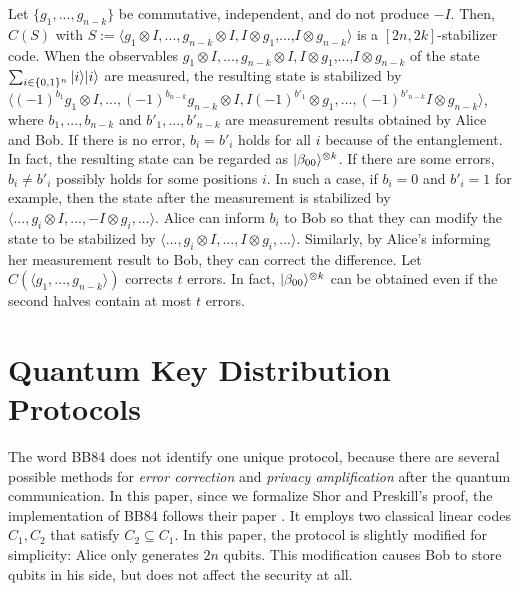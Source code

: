 Let $\{ g_1,...,g_{n-k} \}$ be commutative, independent, and do not
produce $-I$.
Then, $C(S)$ with $S := \langle g_1 \otimes I,...,g_{n-k} \otimes I, I
\otimes g_1$,...,$I \otimes g_{n-k} \rangle$ is a $[2n,2k]$-stabilizer
code. When the observables $g_1 \otimes I,...,g_{n-k} \otimes I, I
\otimes g_1$,...,$I \otimes g_{n-k}$ of the state
$\sum_{i \in \{0,1\}^n}|i\rangle|i\rangle$ are measured, 
the resulting state is stabilized by 
$\langle (-1)^{b_1} g_1 \otimes I,..., (-1)^{b_{n-k}}g_{n-k} \otimes I, I
(-1)^{b'_1}\otimes g_1,...,(-1)^{b'_{n-k}}I \otimes g_{n-k} \rangle$,
where $b_1,...,b_{n-k}$ and $b'_1,...,b'_{n-k}$ are measurement results
obtained by Alice and Bob.
If there is no error,
$b_i = b'_i$ holds for all $i$ because of the entanglement. In fact,
the resulting state can be regarded as
$|\beta_{00}\rangle^{\otimes k}$. If there are some errors,
$b_i \neq b'_i$ possibly holds for some positions $i$.
In such a case, if $b_i = 0$ and $b'_i = 1$ for example, then 
the state after the measurement is stabilized by
$\langle ..., g_i \otimes I,...,-I \otimes g_i,... \rangle$.
Alice can inform $b_i$ to Bob so that
they can modify the state to be stabilized by
$\langle ..., g_i \otimes I,...,I \otimes g_i,... \rangle$.
Similarly, by Alice's informing her measurement result to Bob,
they can correct the difference.
Let $C(\langle g_1,...,g_{n-k}\rangle)$ 
corrects $t$ errors. In fact, $|\beta_{00}\rangle^{\otimes k}$ can be
obtained even if the second halves contain at most $t$ errors.

\section{Quantum Key Distribution Protocols}
The word BB84 does not identify one unique
protocol, because there are
several possible methods for
\emph{error correction} and \emph{privacy amplification} after
the quantum communication.
In this paper, since
we formalize Shor and Preskill's proof,
the implementation of BB84 follows their paper \cite{ShorPreskill2000}.
It employs two classical linear codes $C_1, C_2$ that satisfy
$C_2 \subseteq C_1$.
 In this paper, the protocol is slightly modified for simplicity:
 Alice only generates $2n$ qubits. 
This modification causes Bob to store qubits in his side,
 but does not affect the security at all.

